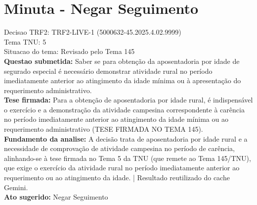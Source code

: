 \documentclass{article}
\begin{document}
\section*{Minuta - Negar Seguimento}
Decisao TRF2: TRF2-LIVE-1 (5000632-45.2025.4.02.9999)\\
Tema TNU: 5\\
Situacao do tema: Revisado pelo Tema 145\\
\textbf{Questao submetida:} Saber se para obtenção da aposentadoria por idade de segurado especial é necessário demonstrar atividade rural no período imediatamente anterior ao atingimento da idade mínima ou à apresentação do requerimento administrativo.\\
\textbf{Tese firmada:} Para a obtenção de aposentadoria por idade rural, é indispensável o exercício e a demonstração da atividade campesina correspondente à carência no período imediatamente anterior ao atingimento da idade mínima ou ao requerimento administrativo (TESE FIRMADA NO TEMA 145).\\
\textbf{Fundamento da analise:} A decisão trata de aposentadoria por idade rural e a necessidade de comprovação de atividade campesina no período de carência, alinhando-se à tese firmada no Tema 5 da TNU (que remete ao Tema 145/TNU), que exige o exercício da atividade rural no período imediatamente anterior ao requerimento ou ao atingimento da idade. | Resultado reutilizado do cache Gemini.\\
\textbf{Ato sugerido:} Negar Seguimento
\end{document}
